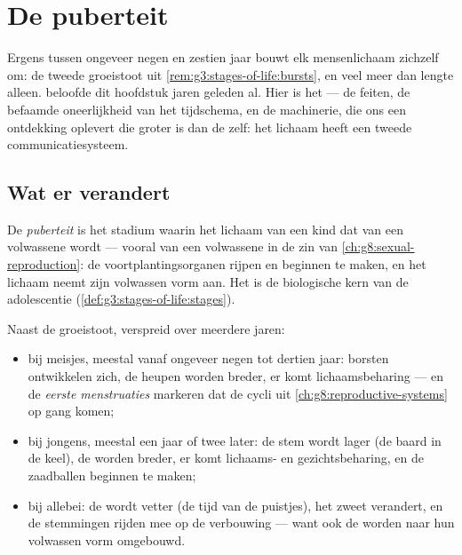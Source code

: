 \chapter{De puberteit}\label{ch:g8:puberty}

Ergens tussen ongeveer negen en zestien jaar bouwt elk mensenlichaam
zichzelf om: de tweede groeistoot uit
\cref{rem:g3:stages-of-life:bursts}, en veel meer dan lengte alleen.
 beloofde dit hoofdstuk jaren
geleden al. Hier is het --- de feiten, de befaamde oneerlijkheid van het
tijdschema, en de machinerie, die ons een ontdekking oplevert die groter
is dan de  zelf: het lichaam heeft een tweede communicatiesysteem.

\section{Wat er verandert}

\begin{definition}[Puberteit]\label{def:g8:puberty:puberty}
De \emph{puberteit} is het stadium waarin het lichaam van
een kind dat van een volwassene wordt --- vooral van een volwassene in de
zin van \cref{ch:g8:sexual-reproduction}: de voortplantingsorganen rijpen
en beginnen \emph{} te maken, en het lichaam neemt zijn volwassen
vorm aan. Het is de biologische kern van de adolescentie
(\cref{def:g3:stages-of-life:stages}).
\end{definition}

\begin{proposition}\label{prop:g8:puberty:changes}
Naast de groeistoot, verspreid over meerdere jaren:
\begin{itemize}
  \item bij meisjes, meestal vanaf ongeveer negen tot dertien jaar:
        borsten ontwikkelen zich, de heupen worden breder, er komt
        lichaamsbeharing --- en de \emph{eerste menstruaties} markeren dat
        de cycli uit \cref{ch:g8:reproductive-systems} op gang komen;
  \item bij jongens, meestal een jaar of twee later: de stem wordt lager
        (de baard in de keel), de  worden breder, er komt
        lichaams- en gezichtsbeharing, en de zaadballen beginnen 
        te maken;
  \item bij allebei: de  wordt vetter (de tijd van de puistjes), het
        zweet verandert, en de stemmingen rijden mee op de verbouwing ---
        want ook de  worden naar hun volwassen vorm omgebouwd.
\end{itemize}
\end{proposition}
\admitted

